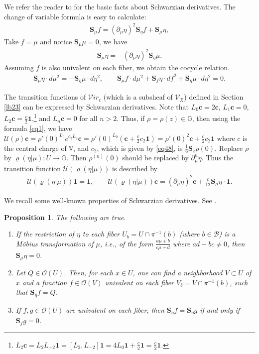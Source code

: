 \documentclass[12pt,a4paper,notitlepage]{article}
\theoremstyle{definition}
\theoremstyle{plain}
\newtheorem{pp}[df]{Proposition}
\newcommand{\fk}{\mathfrak}
\newcommand{\mc}{\mathcal}
\newcommand{\id}{\mathbf{1}}
\newcommand{\scr}{\mathscr}
\newcommand{\Vbb}{\mathbb V}
\newcommand{\Gbb}{\mathbb G}
\newcommand{\cbf}{\mathbf c}
\newcommand{\svir}{\mathcal V\!\mathit{ir}}
\newcommand{\Sbf}{\mathbf{S}}
\numberwithin{equation}{section}
\begin{document}
We refer the reader to \cite{Ahl,Gun} for the basic facts about Schwarzian derivatives. The change of variable formula is easy to calculate:
\begin{align}\label{eq45}
\Sbf_\mu f =(\partial_\mu\eta)^2 \Sbf_\eta f+\Sbf_\mu\eta,
\end{align}
Take $f=\mu$ and notice $\Sbf_\mu\mu=0$, we have
\begin{align}
\Sbf_\mu\eta=-(\partial_\mu\eta)^2\Sbf_\eta\mu.\label{eq46}
\end{align}
Assuming $f$ is also univalent on each fiber, we obtain the cocycle relation.
\begin{align}
\Sbf_\mu\eta\cdot d\mu^2=-\Sbf_\eta\mu\cdot d\eta^2,\qquad \Sbf_\mu f\cdot d\mu^2 + \Sbf_f \eta\cdot df^2+\Sbf_\eta\mu\cdot d\eta^2=0.\label{eq49}
\end{align}




The transition functions of $\svir_c$ (which is a subsheaf of $\scr V_{\fk X}$) defined in Section \ref{lb23} can be expressed by Schwarzian derivatives. Note that $L_0\cbf=2\cbf$, $L_1\cbf=0$, $L_2\cbf=\frac c 2\id$,\footnote{$L_2\cbf=L_2L_{-2}\id=[L_2,L_{-2}]\id=4L_0\id+\frac c 2\id=\frac c 2\id$.} and $L_n\cbf=0$ for all $n>2$. Thus,  if $\rho=\rho(z)\in\Gbb$, then using the formula \eqref{eq1}, we have $\mc U(\rho)\cbf=\rho'(0)^{L_0}e^{c_2L_2}\cbf=\rho'(0)^{L_0}(\cbf+\frac c2c_2\id)=\rho'(0)^2\cbf+\frac c2c_2\id$ where $c$ is the central charge of $\Vbb$, and $c_2$, which is given by \eqref{eq48}, is $\frac 16\Sbf_z\rho(0)$. Replace $\rho$ by $\varrho(\eta|\mu):U\rightarrow\Gbb$. Then $\rho^{(n)}(0)$ should be replaced by $\partial_\mu^n\eta$. Thus the transition function $\mc U(\varrho(\eta|\mu))$ is described by
\begin{gather}
\mc U(\varrho(\eta|\mu))\id=\id,\qquad  \mc U(\varrho(\eta|\mu))\cbf=(\partial_\mu\eta)^2\cbf+\frac {c}{12}\Sbf_\mu\eta \cdot \id.\label{eq47}
\end{gather}



We recall some well-known properties of  Schwarzian derivatives. See \cite{Hub81}.

\begin{pp}\label{lb24}
	The following are true.
	\begin{enumerate}[label=(\arabic*)]
		\item If the restriction of $\eta$ to each fiber $U_b=U\cap\pi^{-1}(b)$ (where $b\in\mc B$) is a M\"obius transformation of $\mu$, i.e., of the form $\frac{a\mu+b}{c\mu+d}$ where $ad-bc\neq 0$, then $\Sbf_\mu \eta=0$.
		\item  Let $Q\in\scr O(U)$. Then, for each $x\in U$, one can find a neighborhood $V\subset U$ of $x$ and a function $f\in\scr O(V)$ univalent on each fiber $V_b=V\cap\pi^{-1}(b)$, such that $\Sbf_\eta f=Q$.
		\item If $f,g\in\scr O(U)$ are univalent on each fiber, then $\Sbf_\eta f=\Sbf_\eta g$ if and only if $\Sbf_f g=0$.
	\end{enumerate}
\end{pp}
\end{document}
